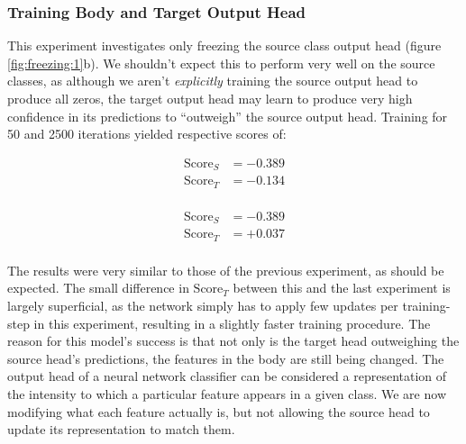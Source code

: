 \documentclass{report}
\newcommand{\SCORE}[2]{
	\begin{align*}
	\text{Score}_S &= #1 \\
	\text{Score}_T &= #2 \\
	\end{align*}
}
\begin{document}
	\subsubsection{Training Body and Target Output Head}
	This experiment investigates only freezing the source class output head (figure \ref{fig:freezing:1}b). We shouldn't expect this to perform very well on the source classes, as although we aren't \emph{explicitly} training the source output head to produce all zeros, the target output head may learn to produce very high confidence in its predictions to ``outweigh'' the source output head. Training for 50 and 2500 iterations yielded respective scores of:
	\SCORE{-0.389}{-0.134}
	\SCORE{-0.389}{+0.037}
	The results were very similar to those of the previous experiment, as should be expected. The small difference in $\text{Score}_T$ between this and the last experiment is largely superficial, as the network simply has to apply few updates per training-step in this experiment, resulting in a slightly faster training procedure. The reason for this model's success is that not only is the target head outweighing the source head's predictions, the features in the body are still being changed. The output head of a neural network classifier can be considered a representation of the intensity to which a particular feature appears in a given class. We are now modifying what each feature actually is, but not allowing the source head to update its representation to match them. \par
	
\end{document}
